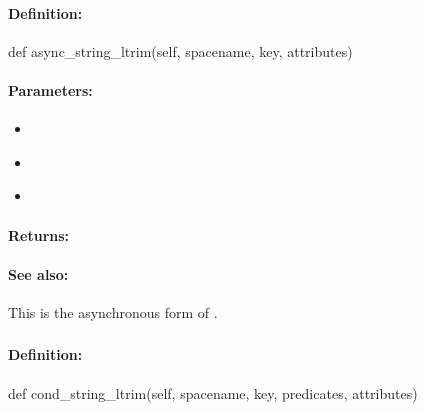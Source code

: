 \paragraph{Definition:}
\begin{pythoncode}
def async_string_ltrim(self, spacename, key, attributes)
\end{pythoncode}

\paragraph{Parameters:}
\begin{itemize}[noitemsep]
\item {}\\

\item {}\\

\item {}\\

\end{itemize}

\paragraph{Returns:}


\paragraph{See also:}  This is the asynchronous form of .

\pagebreak
\subsubsection{}
\label{api:python:cond_string_ltrim}


\paragraph{Definition:}
\begin{pythoncode}
def cond_string_ltrim(self, spacename, key, predicates, attributes)
\end{pythoncode}

